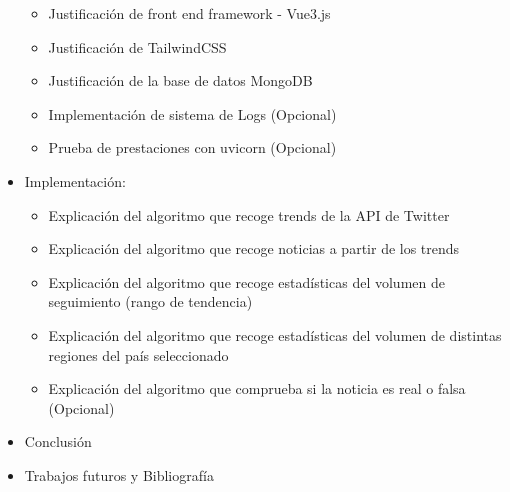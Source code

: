 \begin{itemize}
\begin{itemize}
    \item Justificación de front end framework - Vue3.js
    \item Justificación de TailwindCSS
    \item Justificación de la base de datos MongoDB
    \item Implementación de sistema de Logs (Opcional)
    \item Prueba de prestaciones con uvicorn (Opcional)
\end{itemize}
\item Implementación:
\begin{itemize}
    \item Explicación del algoritmo que recoge trends de la API de Twitter
    \item Explicación del algoritmo que recoge noticias a partir de los trends
    \item Explicación del algoritmo que recoge estadísticas del volumen de seguimiento (rango de tendencia)
    \item Explicación del algoritmo que recoge estadísticas del volumen de distintas regiones del país seleccionado
    \item Explicación del algoritmo que comprueba si la noticia es real o falsa (Opcional)
\end{itemize}
    \item Conclusión
    \item Trabajos futuros y Bibliografía
\end{itemize}

